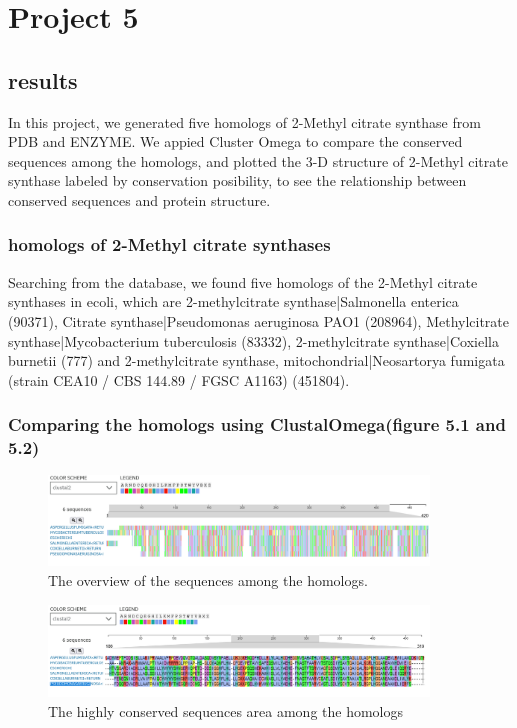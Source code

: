 \documentclass[a4paper,english,12pt,bibliography=totoc]{scrreprt}
\begin{document}
\chapter{Project 5}

\section{results}
In this project, we generated five homologs of 2-Methyl citrate synthase from PDB and ENZYME. We appied Cluster Omega to compare the conserved sequences among the homologs, and plotted the 3-D structure of 2-Methyl citrate synthase labeled by conservation posibility, to see the relationship between conserved sequences and protein structure.

\subsection{homologs of 2-Methyl citrate synthases}

Searching from the database, we found five homologs of the 2-Methyl citrate synthases in ecoli, which are 2-methylcitrate synthase|Salmonella enterica (90371), Citrate synthase|Pseudomonas aeruginosa PAO1 (208964), Methylcitrate synthase|Mycobacterium tuberculosis (83332), 2-methylcitrate synthase|Coxiella burnetii (777) and 2-methylcitrate synthase, mitochondrial|Neosartorya fumigata (strain CEA10 / CBS 144.89 / FGSC A1163) (451804).

\subsection{Comparing the homologs using ClustalOmega(figure 5.1 and 5.2)}

\begin{figure}
    \centering
    \includegraphics[width = 0.9\textwidth]{Project 5/clustalo_image_summary.png}
    \caption{The overview of the sequences among the homologs.}
\end{figure}

\begin{figure}
    \centering
    \includegraphics[width = 0.9\textwidth]{Project 5/clustalo_image_detailed.png}
    \caption{The highly conserved sequences area among the homologs}
\end{figure}
\end{document}
